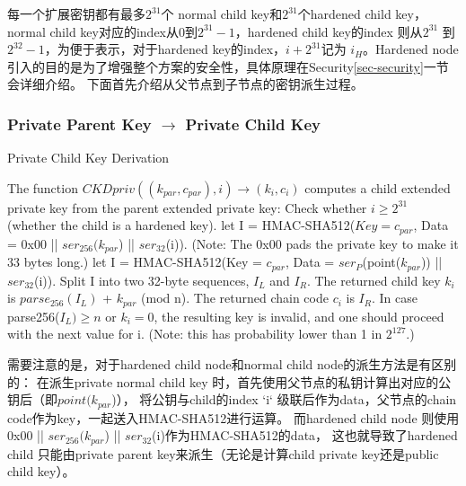  每一个扩展密钥都有最多$2^{31}$个 normal child key和$2^{31}$个hardened child key， 
 normal child key对应的index从0到$2^{31}-1$，hardened child key的index 
 则从$2^{31}$ 到$2^{32}-1$，为便于表示，对于hardened key的index，$i+2^{31}$记为 $i_H$。Hardened node引入的目的是为了增强整个方案的安全性，具体原理在Security\ref{sec-security}一节会详细介绍。
 下面首先介绍从父节点到子节点的密钥派生过程。

\subsubsection{Private Parent Key $\rightarrow$ Private Child Key}
 
\begin{algorithm}[tbp]\footnotesize
\caption{Private Child Key Derivation}
  	\begin{algorithmic}[1]
	    \STATE The function $CKDpriv((k_{par}, c_{par}), i) \rightarrow (k
		_i, c_i)$ computes a child extended private key from the 
		parent extended private key:
		\STATE Check whether $i \geq 2^{31}$ (whether the child is a hardened key).  
			\STATE let I = HMAC-SHA512($Key = c_{par}$, Data = 0x00 || 
			$ser_{256}(k_{par}$) || $ser_{32}$(i)). (Note: The 0x00 pads 
			the private key to make it 33 bytes long.)  
		\ELSE
			\STATE let I = HMAC-SHA512(Key = $c_{par}$, 
			Data = $ser_P$(point($k_{par}$)) || $ser_{32}$(i)).  
		\ENDIF
		\STATE Split I into two 32-byte sequences, $I_L$ and $I_R$.
		\STATE The returned child key $k_i$ is $parse_{256}(I_L)$ + $k_{par}$ (mod n).
		\STATE The returned chain code $c_i$ is $I_R$.  
		\STATE In case parse256($I_L) \geq n$ or $k_i = 0$, the resulting key is invalid, 
		and one should proceed with the next value for i. 
		(Note: this has probability lower than 1 in $2^{127}$.)  
    \end{algorithmic}
\end{algorithm}

需要注意的是，对于hardened child node和normal child node的派生方法是有区别的：
在派生private normal child key 时，首先使用父节点的私钥计算出对应的公钥后（即$point(k_{par}$)），
将公钥与child的index `i` 级联后作为data，父节点的chain code作为key，一起送入HMAC-SHA512进行运算。
而hardened child node 则使用0x00 || $ser_{256}(k_{par}$) || $ser_{32}$(i)作为HMAC-SHA512的data，
这也就导致了hardened child 只能由private parent key来派生（无论是计算child private key还是public child key）。

